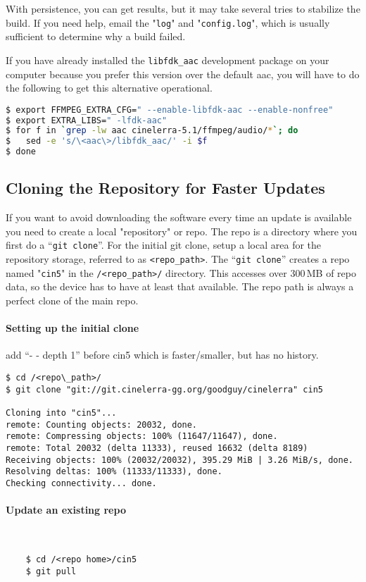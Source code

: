 With persistence, you can get results, but it may take several tries to stabilize the build.  
If you need help, email the "\texttt{log}" and "\texttt{config.log}", which is usually sufficient to determine why a build failed.
\vspace{5ex}

If you have already installed the \texttt{libfdk\_aac} development package on your computer because you prefer this version over the default aac, you will have to do the following to get this alternative operational.

\begin{lstlisting}[language=bash]
$ export FFMPEG_EXTRA_CFG=" --enable-libfdk-aac --enable-nonfree"
$ export EXTRA_LIBS=" -lfdk-aac"
$ for f in `grep -lw aac cinelerra-5.1/ffmpeg/audio/*`; do
$   sed -e 's/\<aac\>/libfdk_aac/' -i $f
$ done
\end{lstlisting}

\subsection{Cloning the Repository for Faster Updates}%
\label{sub:cloning_the_repository_for_faster_updates}

If you want to avoid downloading the software every time an update is available you need to create a local "repository" or repo.  
The repo is a directory where you first do a “\texttt{git clone}”.  
For the initial git clone, setup a local area for the repository storage, referred to as \texttt{<repo\_path>}.  
The “\texttt{git clone}” creates a repo named "\texttt{cin5}" in the \texttt{/<repo\_path>/} directory.  
This accesses over 300\,MB of repo data, so the device has to have at least that available.  
The repo path is always a perfect clone of the main repo.

\paragraph{Setting up the initial clone}%
\label{par:setting_up_the_initial_clone}
add “- - depth 1” before cin5 which is faster/smaller, but has no history.

\begin{lstlisting}
$ cd /<repo\_path>/
$ git clone "git://git.cinelerra-gg.org/goodguy/cinelerra" cin5

Cloning into "cin5"...
remote: Counting objects: 20032, done.
remote: Compressing objects: 100% (11647/11647), done.
remote: Total 20032 (delta 11333), reused 16632 (delta 8189)
Receiving objects: 100% (20032/20032), 395.29 MiB | 3.26 MiB/s, done.
Resolving deltas: 100% (11333/11333), done.
Checking connectivity... done.
\end{lstlisting}

\paragraph{Update an existing repo}%
\label{par:update_an_existing_repo}
~

\begin{lstlisting}
    $ cd /<repo home>/cin5
    $ git pull
\end{lstlisting}







